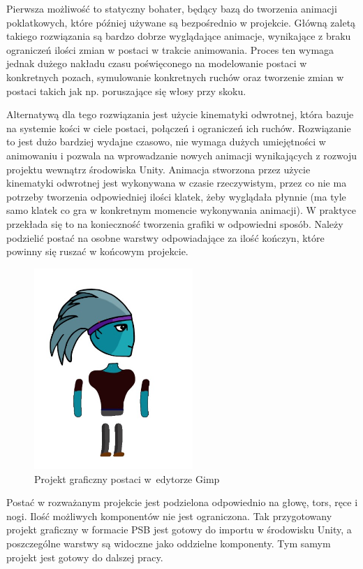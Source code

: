 \documentclass[oneside,polski,logo]{amuthesis}
\begin{document}
Pierwsza możliwość to statyczny bohater, będący bazą do tworzenia animacji poklatkowych, które później używane są bezpośrednio w projekcie. Główną zaletą takiego rozwiązania są bardzo dobrze wyglądające animacje, wynikające z braku ograniczeń ilości zmian w postaci w trakcie animowania.
Proces ten wymaga jednak dużego nakładu czasu poświęconego na modelowanie postaci w konkretnych pozach, symulowanie konkretnych ruchów oraz tworzenie zmian w postaci takich jak np. poruszające się włosy przy skoku.

Alternatywą dla tego rozwiązania jest użycie kinematyki odwrotnej, która bazuje na systemie kości w ciele postaci, połączeń i ograniczeń ich ruchów. Rozwiązanie to jest dużo bardziej wydajne czasowo, nie wymaga dużych umiejętności w animowaniu i pozwala na wprowadzanie nowych animacji wynikających z rozwoju projektu wewnątrz środowiska Unity. Animacja stworzona przez użycie kinematyki odwrotnej jest wykonywana w czasie rzeczywistym, przez co nie ma potrzeby tworzenia odpowiedniej ilości klatek, żeby wyglądała płynnie (ma tyle samo klatek co gra w konkretnym momencie wykonywania animacji).
W praktyce przekłada się to na konieczność tworzenia grafiki w odpowiedni sposób. Należy podzielić postać na osobne warstwy odpowiadające za ilość kończyn, które powinny się ruszać w końcowym projekcie.\\

\begin{figure}[h]
	\centering
	\includegraphics[width=6cm]{images/kozubal/separatedCharacter.jpg}
	\caption{Projekt graficzny postaci w~edytorze Gimp}
\end{figure}

Postać w rozważanym projekcie jest podzielona odpowiednio na głowę, tors, ręce i nogi. Ilość możliwych komponentów nie jest ograniczona. Tak przygotowany projekt graficzny w formacie PSB jest gotowy do importu w środowisku Unity, a poszczególne warstwy są widoczne jako oddzielne komponenty. Tym samym projekt jest gotowy do dalszej pracy.
\end{document}

